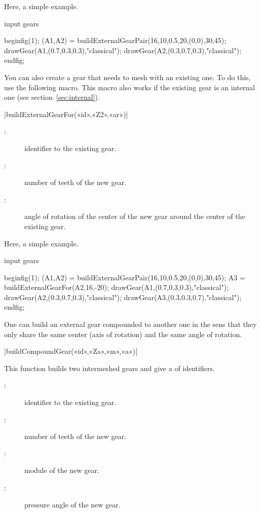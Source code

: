 \documentclass[english]{ltxdoc}
\begin{document}
Here, a simple example.
\begin{ExempleMP}
input gears

beginfig(1);
(A1,A2) = buildExternalGearPair(16,10,0.5,20,(0,0),30,45);
drawGear(A1,(0.7,0.3,0.3),"classical");
drawGear(A2,(0.3,0.7,0.3),"classical");
endfig;
\end{ExempleMP}

You can also create a gear that needs to mesh with an existing one. To do this,
use the following macro. This macro also works if the existing gear is an
internal one (see section~\ref{sec:internal}).

\begin{colourband}
\commande|buildExternalGearFor(«id»,«Z2»,«ar»)|\smallskip{}
\begin{description}
  \item[:]  identifier to the existing gear.
  \item[:]  number of teeth of the new gear.
  \item[:]  angle of rotation of the center
  of the new gear around the center of the existing gear.
\end{description}
\end{colourband}

Here, a simple example.
\begin{ExempleMP}
input gears

beginfig(1);
(A1,A2) = buildExternalGearPair(16,10,0.5,20,(0,0),30,45);
A3 = buildExternalGearFor(A2,16,-20);
drawGear(A1,(0.7,0.3,0.3),"classical");
drawGear(A2,(0.3,0.7,0.3),"classical");
drawGear(A3,(0.3,0.3,0.7),"classical");
endfig;
\end{ExempleMP}

One can build an external gear compounded to another one in the sens that they
only  
share the same center (axis of rotation) and the same angle of rotation. 
\begin{colourband}
\commande|buildCompoundGear(«id»,«Za»,«m»,«a»)|\smallskip{}

This function builds two  intermeshed gears and give a  of 
identifiers. 
\begin{description}
  \item[:]  identifier to the existing gear.
  \item[:]  number of teeth of the new gear.
  \item[:]  module of the new gear.
  \item[:]  pressure angle of the new gear.
\end{description}
\end{colourband}
\end{document}
